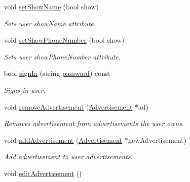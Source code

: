 \begin{DoxyCompactItemize}
void \hyperlink{class_user_a655b1a3e4d1877a8cddb9a3d874c2844}{set\+Show\+Name} (bool show)
\begin{DoxyCompactList}\small\item\em Sets user show\+Name attribute. \end{DoxyCompactList}\item 
void \hyperlink{class_user_ae8606e0f992f391088af95a80aeaef07}{set\+Show\+Phone\+Number} (bool show)
\begin{DoxyCompactList}\small\item\em Sets user show\+Phone\+Number attribute. \end{DoxyCompactList}\item 
bool \hyperlink{class_user_af75d18fdc45ac9fba9911815b78b7daa}{sign\+In} (string \hyperlink{class_user_ab537b9a55bc7d7fcafcdf8e53d085e67}{password}) const 
\begin{DoxyCompactList}\small\item\em Signs in user. \end{DoxyCompactList}\item 
void \hyperlink{class_user_a62c158d18b404de5fa049358c2a64a85}{remove\+Advertisement} (\hyperlink{class_advertisement}{Advertisement} $\ast$ad)
\begin{DoxyCompactList}\small\item\em Removes advertisement from advertisements the user owns. \end{DoxyCompactList}\item 
void \hyperlink{class_user_a7ac881e0b18256f2aa5bc58616994965}{add\+Advertisement} (\hyperlink{class_advertisement}{Advertisement} $\ast$new\+Advertisement)
\begin{DoxyCompactList}\small\item\em Add advertisement to user advertisements. \end{DoxyCompactList}\item 
\hypertarget{class_user_a7f9f8c64216df27994ffe53960d2d18a}{}void \hyperlink{class_user_a7f9f8c64216df27994ffe53960d2d18a}{edit\+Advertisement} ()\label{class_user_a7f9f8c64216df27994ffe53960d2d18a}


\end{DoxyCompactItemize}
